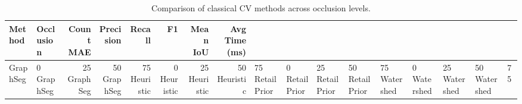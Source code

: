\begin{table}
\caption{Comparison of classical CV methods across occlusion levels.}
\label{tab:classical_results}
\begin{tabular}{llrrrrrr}
\toprule
Method & Occlusion & Count MAE & Precision & Recall & F1 & Mean IoU & Avg Time (ms) \\
\midrule
GraphSeg & 0%
GraphSeg & 25%
GraphSeg & 50%
GraphSeg & 75%
Heuristic & 0%
Heuristic & 25%
Heuristic & 50%
Heuristic & 75%
RetailPrior & 0%
RetailPrior & 25%
RetailPrior & 50%
RetailPrior & 75%
Watershed & 0%
Watershed & 25%
Watershed & 50%
Watershed & 75%
\bottomrule
\end{tabular}
\end{table}
